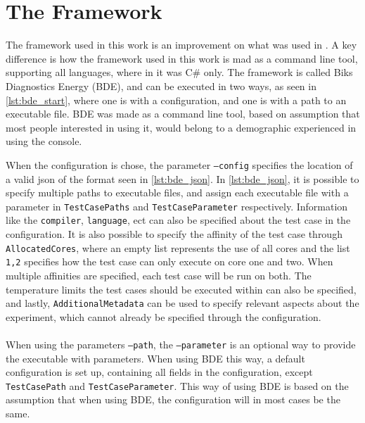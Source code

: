 \section{The Framework}\label{app:framework}

The framework used in this work is an improvement on what was used in \cite{biksbois}. A key difference is how the framework used in this work is mad as a command line tool, supporting all languages, where in \cite{biksbois} it was C\# only. The framework is called Biks Diagnostics Energy (BDE), and can be executed in two ways, as seen in \cref{lst:bde_start}, where one is with a configuration, and one is with a path to an executable file. BDE was made as a command line tool, based on assumption that most people interested in using it, would belong to a demographic experienced in using the console.



When the configuration is chose, the parameter \texttt{--config} specifies the location of a valid json of the format seen in \cref{lst:bde_json}. In \cref{lst:bde_json}, it is possible to specify multiple paths to executable files, and assign each executable file with a parameter in \texttt{TestCasePaths} and \texttt{TestCaseParameter} respectively. Information like the \texttt{compiler}, \texttt{language}, ect can also be specified about the test case in the configuration. It is also possible to specify the affinity of the test case through \texttt{AllocatedCores}, where an empty list represents the use of all cores and the list \texttt{1,2} specifies how the test case can only execute on core one and two. When multiple affinities are specified, each test case will be run on both. The temperature limits the test cases should be executed within can also be specified, and lastly, \texttt{AdditionalMetadata} can be used to specify relevant aspects about the experiment, which cannot already be specified through the configuration.



\paragraph*{}
When using the parameters \texttt{--path}, the \texttt{--parameter} is an optional way to provide the executable with parameters. When using BDE this way, a default configuration is set up, containing all fields in the configuration, except \texttt{TestCasePath} and \texttt{TestCaseParameter}. This way of using BDE is based on the assumption that when using BDE, the configuration will in most cases be the same.
\newpage

